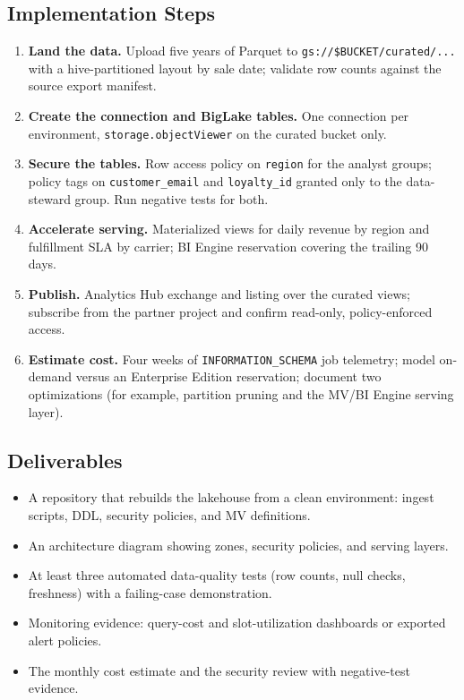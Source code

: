 \subsection*{Implementation Steps}
\begin{enumerate}
    \item \textbf{Land the data.} Upload five years of Parquet to \texttt{gs://\$BUCKET/curated/...} with a hive-partitioned layout by sale date; validate row counts against the source export manifest.
    \item \textbf{Create the connection and BigLake tables.} One connection per environment, \texttt{storage.objectViewer} on the curated bucket only.
    \item \textbf{Secure the tables.} Row access policy on \texttt{region} for the analyst groups; policy tags on \texttt{customer\_email} and \texttt{loyalty\_id} granted only to the data-steward group. Run negative tests for both.
    \item \textbf{Accelerate serving.} Materialized views for daily revenue by region and fulfillment SLA by carrier; BI Engine reservation covering the trailing 90 days.
    \item \textbf{Publish.} Analytics Hub exchange and listing over the curated views; subscribe from the partner project and confirm read-only, policy-enforced access.
    \item \textbf{Estimate cost.} Four weeks of \texttt{INFORMATION\_SCHEMA} job telemetry; model on-demand versus an Enterprise Edition reservation; document two optimizations (for example, partition pruning and the MV/BI Engine serving layer).
\end{enumerate}

\subsection*{Deliverables}
\begin{itemize}
    \item A repository that rebuilds the lakehouse from a clean environment: ingest scripts, DDL, security policies, and MV definitions.
    \item An architecture diagram showing zones, security policies, and serving layers.
    \item At least three automated data-quality tests (row counts, null checks, freshness) with a failing-case demonstration.
    \item Monitoring evidence: query-cost and slot-utilization dashboards or exported alert policies.
    \item The monthly cost estimate and the security review with negative-test evidence.
\end{itemize}

